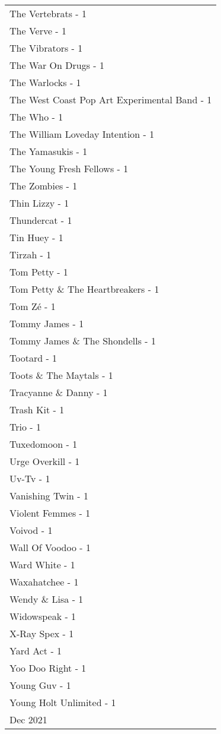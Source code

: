 \documentclass[
]{article}
\begin{document}
\begin{longtable}{l}
The Vertebrats - 1 \\ 
The Verve - 1 \\ 
The Vibrators - 1 \\ 
The War On Drugs - 1 \\ 
The Warlocks - 1 \\ 
The West Coast Pop Art Experimental Band - 1 \\ 
The Who - 1 \\ 
The William Loveday Intention - 1 \\ 
The Yamasukis - 1 \\ 
The Young Fresh Fellows - 1 \\ 
The Zombies - 1 \\ 
Thin Lizzy - 1 \\ 
Thundercat - 1 \\ 
Tin Huey - 1 \\ 
Tirzah - 1 \\ 
Tom Petty - 1 \\ 
Tom Petty \& The Heartbreakers - 1 \\ 
Tom Zé - 1 \\ 
Tommy James - 1 \\ 
Tommy James \& The Shondells - 1 \\ 
Tootard - 1 \\ 
Toots \& The Maytals - 1 \\ 
Tracyanne \& Danny - 1 \\ 
Trash Kit - 1 \\ 
Trio - 1 \\ 
Tuxedomoon - 1 \\ 
Urge Overkill - 1 \\ 
Uv-Tv - 1 \\ 
Vanishing Twin - 1 \\ 
Violent Femmes - 1 \\ 
Voivod - 1 \\ 
Wall Of Voodoo - 1 \\ 
Ward White - 1 \\ 
Waxahatchee - 1 \\ 
Wendy \& Lisa - 1 \\ 
Widowspeak - 1 \\ 
X-Ray Spex - 1 \\ 
Yard Act - 1 \\ 
Yoo Doo Right - 1 \\ 
Young Guv - 1 \\ 
Young Holt Unlimited - 1 \\ 
\midrule
\multicolumn{1}{l}{Dec 2021} \\ 

\end{longtable}
\end{document}
